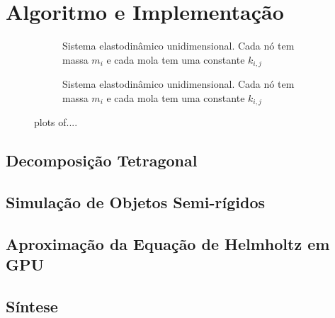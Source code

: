 \chapter{Algoritmo e Implementação}

\begin{figure}[ht]
\begin{subfigure}{\textwidth}
	\centering
	
	\caption[Pipeline off]{Sistema elastodinâmico unidimensional. Cada nó tem massa $m_i$ e cada mola tem uma constante $k_{i,j}$}\label{pipeline_offline}
\end{subfigure}
\begin{subfigure}{\textwidth}
	\centering
	
	\caption[Pipeline on]{Sistema elastodinâmico unidimensional. Cada nó tem massa $m_i$ e cada mola tem uma constante $k_{i,j}$}\label{pipeline_online}
\end{subfigure}
\caption[Overview do pipeline]{ plots of....}
\label{fig:pipeline_overview}
\end{figure}

\section {Decomposição Tetragonal}

\section {Simulação de Objetos Semi-rígidos}

\section {Aproximação da Equação de Helmholtz em GPU}

\section {Síntese}

